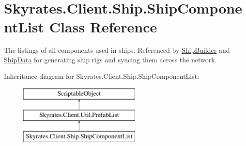 \hypertarget{class_skyrates_1_1_client_1_1_ship_1_1_ship_component_list}{\section{Skyrates.\-Client.\-Ship.\-Ship\-Component\-List Class Reference}
\label{class_skyrates_1_1_client_1_1_ship_1_1_ship_component_list}
}


The listings of all components used in ships. Referenced by \hyperlink{class_skyrates_1_1_client_1_1_ship_1_1_ship_builder}{Ship\-Builder} and \hyperlink{class_ship_data}{Ship\-Data} for generating ship rigs and syncing them across the network.  


Inheritance diagram for Skyrates.\-Client.\-Ship.\-Ship\-Component\-List\-:\begin{figure}[H]
\begin{center}
\leavevmode
\includegraphics[height=3.000000cm]{class_skyrates_1_1_client_1_1_ship_1_1_ship_component_list}
\end{center}
\end{figure}
